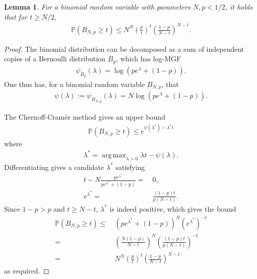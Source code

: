 \documentclass[12pt,reqno]{amsart}
\theoremstyle{plain} %
\newtheorem{lemma}[theorem]{Lemma}
\theoremstyle{remark}
\theoremstyle{definition}
\renewcommand{\P}{\mathbb P}
\DeclareMathOperator*{\argmax}{arg\,max}
\begin{document}
\begin{lemma}\label{lem: chernoff}
For a binomial random variable with parameters $N, p<1/2$, it holds that for $t\ge N/2$,
    \begin{align}
        \P(B_{N,p}\ge t)\le N^N\left(\frac{p}{t}\right)^t\left(\frac{1-p}{N-t}\right)^{N-t}.
    \end{align}
\end{lemma}
\begin{proof}
The binomial distribution can be decomposed as a sum of independent copies of a Bernoulli distribution $B_p$, which has log-MGF
    \begin{align}
        \psi_{B_p}(\lambda)=\log(pe^{\lambda}+(1-p)).
    \end{align}
    One thus has, for a binomial random variable $B_{N,p}$, that
    \begin{align}
        \psi(\lambda):=\psi_{B_{N,p}}(\lambda)=N\log(pe^{\lambda}+(1-p)).
    \end{align}

    The Chernoff-Cram\'er method gives an upper bound
    \begin{align}
        \P(B_{N,p}\ge t)\le e^{\psi(\lambda^*)-\lambda^* t}
    \end{align}
    where 
    \begin{align}
        \lambda^*=\argmax_{\lambda>0} \lambda t-\psi(\lambda).
    \end{align}
    Differentiating gives a candidate $\lambda^*$ satisfying
    \begin{align}
        t-N\frac{pe^{\lambda^*}}{pe^{\lambda^*}+(1-p)}=&\ 0,\\
        e^{\lambda^*}=&\ \frac{(1-p)t}{p(N-t)}.
    \end{align}
    Since $1-p>p$ and $t\ge N-t$, $\lambda^*$ is indeed positive, which gives the bound
    \begin{align}
        \P(B_{N,p}\ge t)\le&\ \left(pe^{\lambda^*}+(1-p)\right)^N(e^{\lambda^*})^{-t}\\
        =&\ \left(\frac{N(1-p)}{N-t}\right)^N\left(\frac{(1-p)t}{p(N-t)}\right)^{-t}\\
        =&\ N^N\left(\frac{p}{t}\right)^t\left(\frac{1-p}{N-t}\right)^{N-t}
    \end{align}
    as required.
\end{proof}
\end{document}
